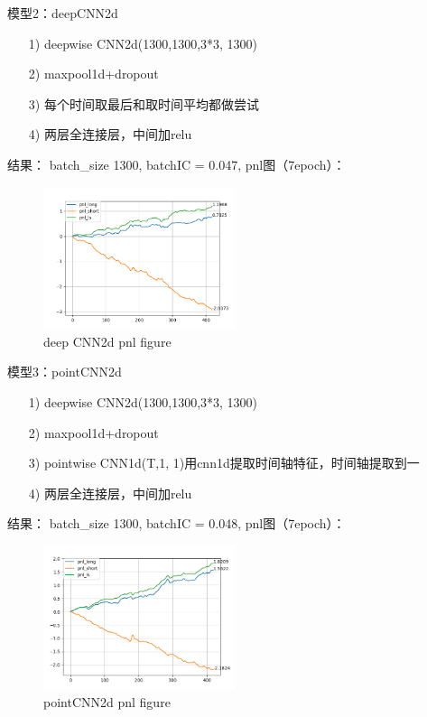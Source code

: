 \documentclass[11pt]{ctexart}
\begin{document}
模型2：deepCNN2d
\begin{itemize}
  \item [1)]
  deepwise CNN2d(1300,1300,3*3, 1300)
  \item [2)]
  maxpool1d+dropout
  \item [3)]
  每个时间取最后和取时间平均都做尝试
  \item [4)]
  两层全连接层，中间加relu

\end{itemize}
结果： batch\_size 1300, batchIC = 0.047,
pnl图（7epoch）：
\begin{figure}[h!]
\begin{center}
\includegraphics[width=0.5\textwidth]{4.PNG}
\end{center}
\caption{deep CNN2d pnl figure}
\label{FIG.3}
\end{figure}

模型3：pointCNN2d
\begin{itemize}
  \item [1)]
  deepwise CNN2d(1300,1300,3*3, 1300)
  \item [2)]
  maxpool1d+dropout
  \item [3)]
  pointwise CNN1d(T,1, 1)用cnn1d提取时间轴特征，时间轴提取到一
  \item [4)]
  两层全连接层，中间加relu

\end{itemize}
结果： batch\_size 1300, batchIC = 0.048,
pnl图（7epoch）：
\begin{figure}[h!]
\begin{center}
\includegraphics[width=0.5\textwidth]{5.PNG}
\end{center}
\caption{pointCNN2d pnl figure}
\label{FIG.4}
\end{figure}
\end{document}
